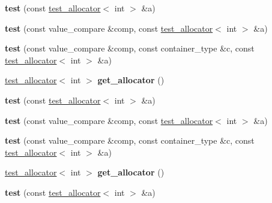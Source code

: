\begin{DoxyCompactItemize}
\item 
\mbox{\label{structtest_a6cbe38c39948288cef13b3f05a759671}} 
{\bfseries test} (const \mbox{\hyperlink{classtest__allocator}{test\+\_\+allocator}}$<$ int $>$ \&a)
\item 
\mbox{\label{structtest_a1c50367305d6ff2edfe671cbe4e3a571}} 
{\bfseries test} (const value\+\_\+compare \&comp, const \mbox{\hyperlink{classtest__allocator}{test\+\_\+allocator}}$<$ int $>$ \&a)
\item 
\mbox{\label{structtest_a4414ff2f3f26f8ccf0297f2766982745}} 
{\bfseries test} (const value\+\_\+compare \&comp, const container\+\_\+type \&c, const \mbox{\hyperlink{classtest__allocator}{test\+\_\+allocator}}$<$ int $>$ \&a)
\item 
\mbox{\label{structtest_a2c31ee85ae81b89114b3f14daca091cb}} 
\mbox{\hyperlink{classtest__allocator}{test\+\_\+allocator}}$<$ int $>$ {\bfseries get\+\_\+allocator} ()
\item 
\mbox{\label{structtest_a6cbe38c39948288cef13b3f05a759671}} 
{\bfseries test} (const \mbox{\hyperlink{classtest__allocator}{test\+\_\+allocator}}$<$ int $>$ \&a)
\item 
\mbox{\label{structtest_a1c50367305d6ff2edfe671cbe4e3a571}} 
{\bfseries test} (const value\+\_\+compare \&comp, const \mbox{\hyperlink{classtest__allocator}{test\+\_\+allocator}}$<$ int $>$ \&a)
\item 
\mbox{\label{structtest_a4414ff2f3f26f8ccf0297f2766982745}} 
{\bfseries test} (const value\+\_\+compare \&comp, const container\+\_\+type \&c, const \mbox{\hyperlink{classtest__allocator}{test\+\_\+allocator}}$<$ int $>$ \&a)
\item 
\mbox{\label{structtest_a2c31ee85ae81b89114b3f14daca091cb}} 
\mbox{\hyperlink{classtest__allocator}{test\+\_\+allocator}}$<$ int $>$ {\bfseries get\+\_\+allocator} ()
\item 
\mbox{\label{structtest_a6cbe38c39948288cef13b3f05a759671}} 
{\bfseries test} (const \mbox{\hyperlink{classtest__allocator}{test\+\_\+allocator}}$<$ int $>$ \&a)

\end{DoxyCompactItemize}
